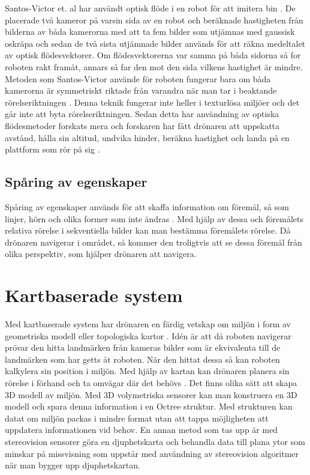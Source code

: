 Santos-Victor et. al har användt optisk flöde i en robot för att imitera bin \citep{341094}. De placerade två kameror på varsin sida av en robot och beräknade hastigheten från bilderna av båda kamerorna med att ta fem bilder som utjämnas med gaussisk oskräpa och sedan de två sista utjämnade bilder används för att räkna medeltalet av optisk flödesvektorer. Om flödesvektorerna var samma på båda sidorna så for roboten rakt framåt, annars så far den mot den sida vilkens hastighet är mindre. Metoden som Santos-Victor använde för roboten fungerar bara om båda kamerorna är symmetriskt riktade från varandra när man tar i beaktande rörelseriktningen \citep{982903}. Denna teknik fungerar inte heller i texturlösa miljöer och det går inte att byta rörelseriktningen. Sedan detta har användning av optiska flödesmetoder forskats mera och forskaren har fått drönaren att uppskatta avstånd, hålla sin altitud, undvika hinder, beräkna hastighet och landa på en plattform som rör på sig \citep{6564752}.

\subsection{Spåring av egenskaper}
Spåring av egenskaper används för att skaffa information om föremål, så som linjer, hörn och olika former som inte ändras \citep{geospatial}. Med hjälp av dessa och föremålets relativa rörelse i sekventiella bilder kan man bestämma föremålets rörelse. Då drönaren navigerar i området, så kommer den troligtvis att se dessa föremål från olika perspektiv, som hjälper drönaren att navigera.

\section{Kartbaserade system}

Med kartbaserade system har drönaren en färdig vetskap om miljön i form av geometriska modell eller topologiska kartor \citep{982903}. Idén är att då roboten navigerar prövar den hitta landmärken från kameras bilder som är ekvivalenta till de landmärken som har getts åt roboten. När den hittat dessa så kan roboten kalkylera sin position i miljön. Med hjälp av kartan kan drönaren planera sin rörelse i förhand och ta omvägar där det behövs \citep{geospatial}. Det finns olika sätt att skapa 3D modell av miljön. Med 3D volymetriska sensorer kan man konstruera en 3D modell och spara denna information i en Octree struktur. Med strukturen kan datat om miljön packas i mindre format utan att tappa möjligheten att uppdatera informationen vid behov. En annan metod som tas upp är med stereovision sensorer göra en djuphetskarta och behandla data till plana ytor som minskar på missvisning som uppstår med användning av stereovision algoritmer när man bygger upp djuphetskartan.

